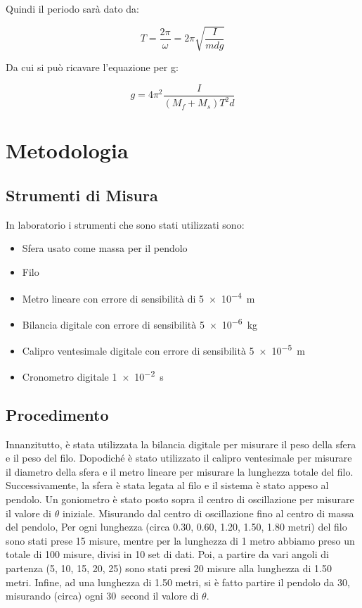 \documentclass[a4paper]{article}
\begin{document}
Quindi il periodo sarà dato da:

\begin{equation} \label{Eq 10}
    T = \frac{2\pi}{\omega} = 2\pi\sqrt{\frac{I}{mdg}}
\end{equation}

Da cui si può ricavare l'equazione per g:

\begin{equation} \label{Eq 11}
    g = 4\pi^2\frac{I}{(M_f+M_s)T^2d}
\end{equation}

\section{Metodologia}
\subsection{Strumenti di Misura}
In laboratorio i strumenti che sono stati utilizzati sono:
\begin{itemize}
    \item Sfera usato come massa per il pendolo 
    \item Filo 
    \item Metro lineare con errore di sensibilità di \SI{5e-4}{\meter}
    \item Bilancia digitale con errore di sensibilità \SI{5e-6}{\kilogram}
    \item Calipro ventesimale digitale con errore di sensibilità \SI{5e-5}{\meter}
    \item Cronometro digitale \SI{1e-2}{\second}
\end{itemize}

\subsection{Procedimento}
Innanzitutto, è stata utilizzata la bilancia digitale per misurare il peso della sfera e il peso del filo. Dopodiché è stato utilizzato il calipro ventesimale per misurare il diametro della sfera e il metro lineare per misurare la lunghezza totale del filo. 
\newline Successivamente, la sfera è stata legata al filo e il sistema è stato appeso al pendolo. Un goniometro è stato posto sopra il centro di oscillazione per misurare il valore di $\theta$ iniziale. 
\newline Misurando dal centro di oscillazione fino al centro di massa del pendolo, Per ogni lunghezza (circa 0.30, 0.60, 1.20, 1.50, 1.80 metri) del filo sono stati prese 15 misure, mentre per la lunghezza di 1 metro abbiamo preso un totale di 100 misure, divisi in 10 set di dati. Poi, a partire da vari angoli di partenza (5\degree, 10\degree, 15\degree, 20\degree, 25\degree) sono stati presi 20 misure alla lunghezza di 1.50 metri. Infine, ad una lunghezza di 1.50 metri, si è fatto partire il pendolo da 30\degree, misurando (circa) ogni \SI{30}{second} il valore di $\theta$.
\end{document}
